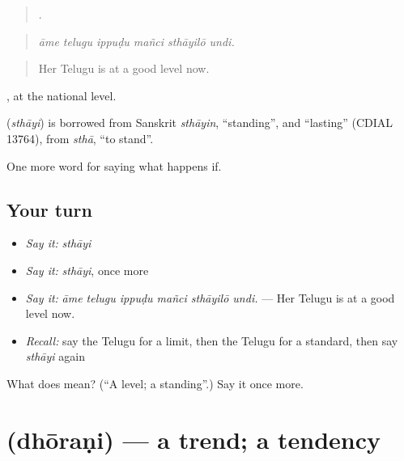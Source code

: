 \begin{quote}
     .
\end{quote}

\begin{quote}
\emph{āme telugu ippuḍu mañci sthāyilō undi.}
\end{quote}

\begin{quote}
Her Telugu is at a good level now.
\end{quote}

 , at the national level.

\begin{cousinweb}
\textbf{} (\emph{sthāyi}) is borrowed from Sanskrit \emph{sthāyin}, \textquotedblleft{}standing\textquotedblright{}, and \textquotedblleft{}lasting\textquotedblright{} (CDIAL 13764), from \emph{sthā}, \textquotedblleft{}to stand\textquotedblright{}.
\end{cousinweb}

\begin{grammarlens}[title={What you've built}]
One more word for saying what happens if.
\end{grammarlens}

\subsection*{Your turn}
\begin{itemize}
\raggedright
  \item \emph{Say it:} \emph{sthāyi}
  \item \emph{Say it:} \emph{sthāyi}, once more
  \item \emph{Say it:} \emph{āme telugu ippuḍu mañci sthāyilō undi.} — Her Telugu is at a good level now.
  \item \emph{Recall:} say the Telugu for a limit, then the Telugu for a standard, then say \emph{sthāyi} again
\end{itemize}

\begin{tcolorbox}[breakable,colback=teal!4,colframe=teal!35!black,title={Before you move on}]
What does  mean? (\textquotedblleft{}A level; a standing\textquotedblright{}.) Say it once more.
\end{tcolorbox}
\section[\texorpdfstring{\te{ధోరణి} (dhōraṇi)}{ధోరణి (dhōraṇi)}]{ (dhōraṇi) — a trend; a tendency}

